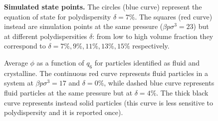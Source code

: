 \documentclass[twocolumn,superscriptaddress]{revtex4-1}
\begin{document}
\tikzset{external/force remake=false}
\begin{figure}
	\caption{\textbf{Simulated state points.} The circles (blue curve) represent the equation of state for polydispersity $\delta=7\%$. The squares (red curve) instead are simulation points at the same pressure ($\beta p\sigma^3=23$) but at different polydispersities $\delta$: from low to high volume fraction they correspond to $\delta=7\%,9\%,11\%,13\%,15\%$ respectively.}
	\label{fig:eos}
\end{figure}

\tikzset{external/force remake=false}
\begin{figure}
	 \caption{Average $\phi$ as a function of $q_6$ for particles identified as fluid and crystalline. The continuous red curve represents fluid particles in a system at $\beta p\sigma^3=17$ and $\delta=0\%$, while dashed blue curve represents fluid particles at the same pressure but at $\delta=4\%$. The thick black curve represents instead solid particles (this curve is less sensitive to polydispersity and it is reported once).}
 \label{fig:stability_map}
\end{figure}
\end{document}
